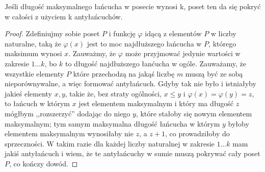   \begin{theorem}
      Jeśli długość maksymalnego łańcucha w posecie wynosi k, poset ten da się pokryć w całości z użyciem k antyłańcuchów.
    \end{theorem}

    \begin{proof}
        Zdefiniujmy sobie poset $P$ i funkcję $\varphi$ idącą z elementów $P$ w liczby naturalne, taką że $\varphi(x)$ jest to moc najdłuższego łańcucha w $P$, którego maksimum wynosi $x$. Zauważmy, że $\varphi$ może przyjmować jedynie wartości w zakresie $1 \dots k$, bo $k$ to długość najdłuższego łanćucha w ogóle. Zauważamy, że wszystkie elementy $P$ które przechodzą na jakąś liczbę $m$ muszą być ze sobą nieporównywalne, a więc formować antyłańcuch. Gdyby tak nie było i istniałyby jakieś elementy $x, y$, takie że, bez straty ogólności, $x \leq y$ i $\varphi(x) = \varphi(y) = z$, to łańcuch w którym $x$ jest elementem maksymalnym i który ma długość $z$ mógłbym ,,rozszerzyć'' dodając do niego $y$, które stałoby się nowym elementem maksymalnym; tym samym maksymalna długość łańcucha w którym $y$ byłoby elementem maksymalnym wynosiłaby nie $z$, a $z+1$, co prowadziłoby do sprzeczności. W takim razie dla każdej liczby naturalnej w zakresie $1 \dots k$ mam jakiś antyłańcuch i wiem, że te antyłańcuchy w sumie muszą pokrywać cały poset $P$, co kończy dowód.
     \end{proof}